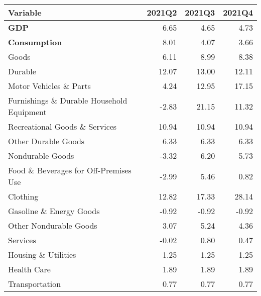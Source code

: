 \documentclass[11pt, letterpaper]{article}\usepackage[]{graphicx}\usepackage[]{color}
\begin{document}
\begin{table}[H]
\centering
\begingroup\fontsize{10pt}{12pt}\selectfont
\begin{tabular}{lrrr}
  \hline
Variable & 2021Q2 & 2021Q3 & 2021Q4 \\ 
  \hline
\hspace{0mm} \textbf{GDP} & 6.65 & 4.65 & 4.73 \\ 
  \hspace{0mm} \textbf{Consumption} & 8.01 & 4.07 & 3.66 \\ 
  \hspace{8mm}  Goods & 6.11 & 8.99 & 8.38 \\ 
  \hspace{16mm}  Durable & 12.07 & 13.00 & 12.11 \\ 
  \hspace{24mm}  Motor Vehicles \& Parts & 4.24 & 12.95 & 17.15 \\ 
  \hspace{24mm}  Furnishings \& Durable Household Equipment & -2.83 & 21.15 & 11.32 \\ 
  \hspace{24mm}  Recreational Goods \& Services & 10.94 & 10.94 & 10.94 \\ 
  \hspace{24mm}  Other Durable Goods & 6.33 & 6.33 & 6.33 \\ 
  \hspace{16mm}  Nondurable Goods & -3.32 & 6.20 & 5.73 \\ 
  \hspace{24mm}  Food \& Beverages for Off-Premises Use & -2.99 & 5.46 & 0.82 \\ 
  \hspace{24mm}  Clothing & 12.82 & 17.33 & 28.14 \\ 
  \hspace{24mm}  Gasoline \& Energy Goods & -0.92 & -0.92 & -0.92 \\ 
  \hspace{24mm}  Other Nondurable Goods & 3.07 & 5.24 & 4.36 \\ 
  \hspace{8mm}  Services & -0.02 & 0.80 & 0.47 \\ 
  \hspace{16mm}  Housing \& Utilities & 1.25 & 1.25 & 1.25 \\ 
  \hspace{16mm}  Health Care & 1.89 & 1.89 & 1.89 \\ 
  \hspace{16mm}  Transportation & 0.77 & 0.77 & 0.77 \\ 

\end{tabular}
\end{table}
\end{document}
